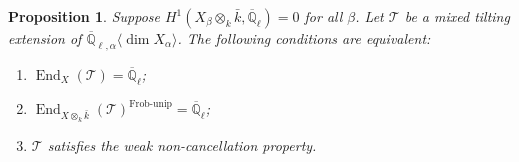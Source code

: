 \documentclass{amsart}
\theoremstyle{plain}
\newtheorem{prop}[subsubsection]{Proposition}
\theoremstyle{definition}
\theoremstyle{remark}
\numberwithin{equation}{subsection}
\begin{document}
\begin{prop}\label{p:noncancel}
Suppose $H^1({{X_\beta}\otimes_k\bar{k}},{\overline{\mathbb{Q}}_{\ell}})=0$ for all $\beta$. Let ${\mathcal{T}}$ be a mixed tilting extension of ${\overline{\mathbb{Q}}_{\ell,\alpha}{\langle{{\dim X_\alpha}}\rangle}}$. The following conditions are equivalent:
\begin{enumerate}[(1)]
 \item $\operatorname{End}_X({\mathcal{T}})={\overline{\mathbb{Q}}_{\ell}}$;
 \item $\operatorname{End}_{{{X}\otimes_k\bar{k}}}({\mathcal{T}})^\operatorname{Frob-unip}={\overline{\mathbb{Q}}_{\ell}}$;
 \item ${\mathcal{T}}$  satisfies the weak non-cancellation property.
\end{enumerate}
\end{prop}
\end{document}
